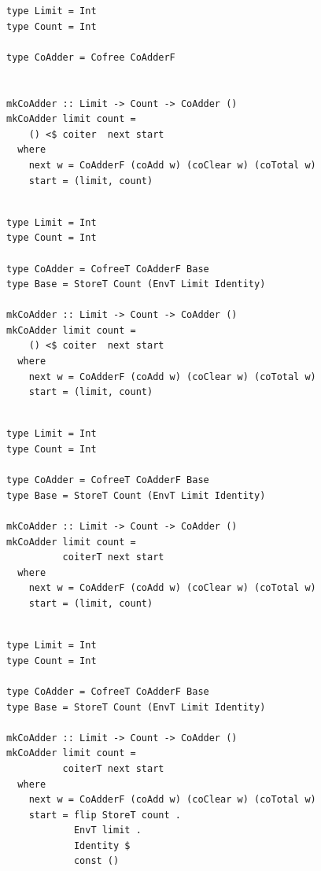 \documentclass{beamer}
\begin{document}
\begin{frame}[fragile]
  \begin{overprint}
  \begin{verbatim}
type Limit = Int
type Count = Int

type CoAdder = Cofree CoAdderF


mkCoAdder :: Limit -> Count -> CoAdder ()
mkCoAdder limit count =
    () <$ coiter  next start
  where
    next w = CoAdderF (coAdd w) (coClear w) (coTotal w)
    start = (limit, count)


  \end{verbatim}
  \begin{verbatim}
type Limit = Int
type Count = Int

type CoAdder = CofreeT CoAdderF Base
type Base = StoreT Count (EnvT Limit Identity)

mkCoAdder :: Limit -> Count -> CoAdder ()
mkCoAdder limit count =
    () <$ coiter  next start
  where
    next w = CoAdderF (coAdd w) (coClear w) (coTotal w)
    start = (limit, count)


  \end{verbatim}
  \begin{verbatim}
type Limit = Int
type Count = Int

type CoAdder = CofreeT CoAdderF Base
type Base = StoreT Count (EnvT Limit Identity)

mkCoAdder :: Limit -> Count -> CoAdder ()
mkCoAdder limit count =
          coiterT next start
  where
    next w = CoAdderF (coAdd w) (coClear w) (coTotal w)
    start = (limit, count)


  \end{verbatim}
  \begin{verbatim}
type Limit = Int
type Count = Int

type CoAdder = CofreeT CoAdderF Base
type Base = StoreT Count (EnvT Limit Identity)

mkCoAdder :: Limit -> Count -> CoAdder ()
mkCoAdder limit count =
          coiterT next start
  where
    next w = CoAdderF (coAdd w) (coClear w) (coTotal w)
    start = flip StoreT count .
            EnvT limit .
            Identity $
            const ()
  \end{verbatim}
  \end{overprint}
\end{frame}

\end{document}
